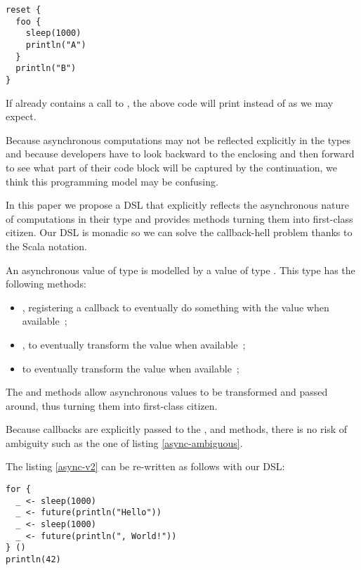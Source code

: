\documentclass[american,english,runningheads]{llncs}
\begin{document}
\begin{lstlisting}[label=async-ambiguous,caption=Ambiguous reading]
reset {
  foo {
    sleep(1000)
    println("A")
  }
  println("B")
}
\end{lstlisting}

If  already contains a call to , the above code will print  instead of  as we may expect.

Because asynchronous computations may not be reflected explicitly in the types and because developers have to look backward to the enclosing  and then forward to see what part of their code block will be captured by the continuation, we think this programming model may be confusing.

In this paper we propose a DSL that explicitly reflects the asynchronous nature of computations in their type and provides methods turning them into first-class citizen. Our DSL is monadic so we can solve the callback-hell problem thanks to the Scala  notation.

An asynchronous value of type  is modelled by a value of type . This type has the following methods:
\begin{itemize}
\item {}, registering a callback to eventually do something with the value when available~;
\item {}, to eventually transform the value when available~;
\item {} to eventually transform the value when available~;
\end{itemize}

The  and  methods allow asynchronous values to be transformed and passed around, thus turning them into first-class citizen.

Because callbacks are explicitly passed to the ,  and  methods, there is no risk of ambiguity such as the one of listing \ref{async-ambiguous}.

The listing \ref{async-v2} can be re-written as follows with our DSL:

\begin{lstlisting}
for {
  _ <- sleep(1000)
  _ <- future(println("Hello"))
  _ <- sleep(1000)
  _ <- future(println(", World!"))
} ()
println(42)
\end{lstlisting}
\end{document}
